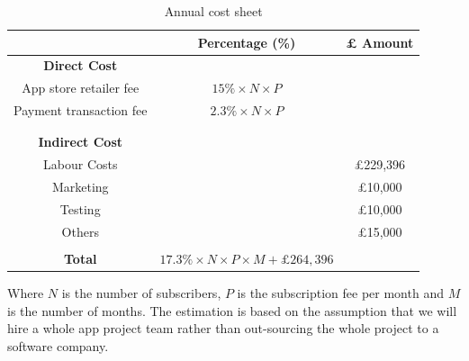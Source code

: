 \begin{table}[ht]
\centering
\begin{tabular}{ |c|c|c|} 
 \hline
 &\textbf{Percentage (\%)} &\textbf{ £ Amount }\\
 \hline
\multicolumn{1}{|c}{\textbf{Direct Cost}} &\multicolumn{1}{c}{}&\\
 \hline
 App store retailer fee&$15\%\times N \times P$&\\
 \hline
 Payment transaction fee&$2.3\% \times N \times P$&\\
 \hline
 &&\\
 \hline
 \multicolumn{1}{|c}{}&\multicolumn{1}{c}{}&\\\hline
 \multicolumn{1}{|c}{\textbf{Indirect Cost}} &\multicolumn{1}{c}{}&\\
 \hline
 Labour Costs&&£229,396\\
 \hline
 Marketing&&£10,000\\
 \hline
 Testing&&£10,000\\
 \hline
 Others&&£15,000\\
 \hline
 \multicolumn{1}{|c}{}&\multicolumn{1}{c}{}&\\
 \hline
 \textbf{Total}&\multicolumn{1}{c}{$17.3\%\times N \times P \times M + \pounds 264,396$}&\\
 \hline
 \end{tabular}
 \caption{Annual cost sheet}
 \end{table}
Where $N$ is the number of subscribers, $P$ is the subscription fee per month and $M$ is the number of months. The estimation is based on the assumption that we will hire a whole app project team rather than out-sourcing the whole project to a software company.

